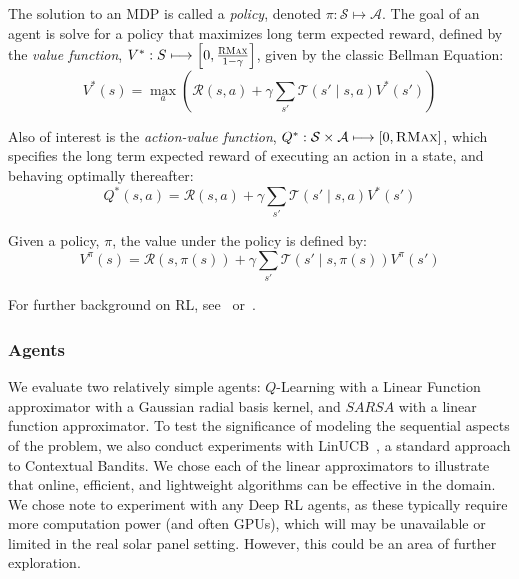 \documentclass{article}
\newcommand{\mc}{\mathcal}
\begin{document}
{The solution to an MDP is called a {\it policy}, denoted $\pi : \mc{S} \longmapsto \mc{A}$. The goal of an agent is solve for a policy that maximizes long term expected reward, defined by the {\it value function}, $V^* : S \longmapsto \left[0,\frac{\textsc{RMax}}{1-\gamma}\right]$, given by the classic Bellman Equation:
\begin{equation}
V^*(s) = \max_a \left(\mc{R}(s,a) + \gamma \sum_{s'} \mc{T}(s' \mid s, a) V^*(s') \right)
\end{equation}

Also of interest is the {\it action-value function}, $Q^*: \mc{S} \times \mc{A} \longmapsto [0,\textsc{RMax}]$, which specifies the long term expected reward of executing an action in a state, and behaving optimally thereafter:
\begin{equation}
Q^*(s,a) = \mc{R}(s,a) + \gamma \sum_{s'} \mc{T}(s' \mid s,a) V^*(s')
\end{equation}

Given a policy, $\pi$, the value under the policy is defined by:
\begin{equation}
V^\pi(s) = \mc{R}(s, \pi(s)) + \gamma \sum_{s'} \mc{T}(s' \mid s, \pi(s)) V^\pi(s')
\end{equation}

For further background on RL, see~\citet{sutton1998reinforcement} or~\citet{kaelbling1996reinforcement}.

\subsubsection{Agents}

We evaluate two relatively simple agents: $Q$-Learning with a Linear Function approximator with a Gaussian radial basis kernel, and $SARSA$ with a linear function approximator. To test the significance of modeling the sequential aspects of the problem, we also conduct experiments with LinUCB~\cite{li2010contextual}, a standard approach to Contextual Bandits. We chose each of the linear approximators to illustrate that online, efficient, and lightweight algorithms can be effective in the domain. We chose note to experiment with any Deep RL agents, as these typically require more computation power (and often GPUs), which will may be unavailable or limited in the real solar panel setting. However, this could be an area of further exploration.

}
\end{document}
